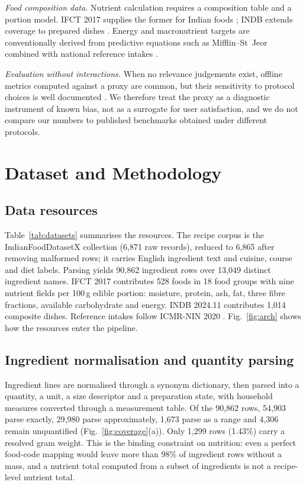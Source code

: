\documentclass[conference]{IEEEtran}
\begin{document}
\emph{Food composition data.} Nutrient calculation requires a composition table
and a portion model. IFCT 2017 supplies the former for Indian foods
\cite{ifct2017}; INDB extends coverage to prepared dishes \cite{indb2024}. Energy
and macronutrient targets are conventionally derived from predictive equations
such as Mifflin--St~Jeor \cite{mifflin1990} combined with national reference
intakes \cite{icmrnin2020}.

\emph{Evaluation without interactions.} When no relevance judgements exist,
offline metrics computed against a proxy are common, but their sensitivity to
protocol choices is well documented \cite{said2014}. We therefore treat the proxy
as a diagnostic instrument of known bias, not as a surrogate for user
satisfaction, and we do not compare our numbers to published benchmarks obtained
under different protocols.

\section{Dataset and Methodology}
\label{sec:method}

\subsection{Data resources}
\label{sec:data}

Table~\ref{tab:datasets} summarises the resources. The recipe corpus is the
IndianFoodDatasetX collection (6{,}871 raw records), reduced to 6{,}865 after
removing malformed rows; it carries English ingredient text and cuisine, course
and diet labels. Parsing yields 90{,}862 ingredient rows over 13{,}049 distinct
ingredient names. IFCT 2017 contributes 528 foods in 18 food groups with nine
nutrient fields per 100\,g edible portion: moisture, protein, ash, fat, three fibre
fractions, available carbohydrate and energy. INDB 2024.11 contributes 1{,}014
composite dishes. Reference intakes follow ICMR-NIN 2020 \cite{icmrnin2020}.
Fig.~\ref{fig:arch} shows how the resources enter the pipeline.



\subsection{Ingredient normalisation and quantity parsing}
\label{sec:parsing}

Ingredient lines are normalised through a synonym dictionary, then parsed into a
quantity, a unit, a size descriptor and a preparation state, with household
measures converted through a measurement table. Of the 90{,}862 rows, 54{,}903
parse exactly, 29{,}980 parse approximately, 1{,}673 parse as a range and 4{,}306
remain unquantified (Fig.~\ref{fig:coverage}(a)). Only 1{,}299 rows (1.43\%) carry
a resolved gram weight. This is the binding constraint on nutrition: even a
perfect food-code mapping would leave more than 98\% of ingredient rows without a
mass, and a nutrient total computed from a subset of ingredients is not a
recipe-level nutrient total.
\end{document}
